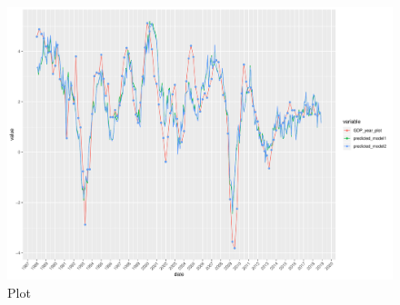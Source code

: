 \documentclass[12pt,a4paper,oneside]{book}
\begin{document}
\begin{figure}[H]
    \centering
    \captionsetup{justification=centering}
    \includegraphics[scale=0.5]{Graphs/pred3.pdf}
    \caption{Plot }
    \label{pred3}
\end{figure}
\end{document}
